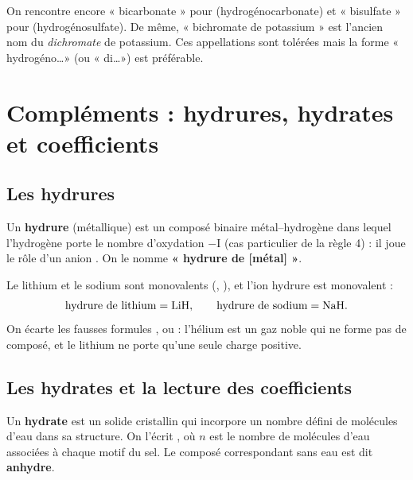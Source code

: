 \documentclass[11pt,a4paper]{article}
\begin{document}
\begin{remarque}
On rencontre encore « bicarbonate » pour  (hydrogénocarbonate) et « bisulfate » pour 
(hydrogénosulfate). De même, « bichromate de potassium »  est l'ancien nom du
\emph{dichromate} de potassium. Ces appellations sont tolérées mais la forme « hydrogéno\ldots » (ou
« di\ldots ») est préférable.
\end{remarque}

\section{Compléments : hydrures, hydrates et coefficients}
\subsection{Les hydrures}

\begin{definition}[hydrure]
Un \textbf{hydrure} (métallique) est un composé binaire métal--hydrogène dans lequel l'hydrogène porte
le nombre d'oxydation $-\mathrm{I}$ (cas particulier de la règle 4) : il joue le rôle d'un anion .
On le nomme \textbf{« hydrure de [métal] »}.
\end{definition}

\begin{exemple}
Le lithium et le sodium sont monovalents (, ), et l'ion hydrure  est monovalent :
\[ \text{hydrure de lithium} = \ce{LiH}, \qquad \text{hydrure de sodium} = \ce{NaH}. \]
On écarte les fausses formules ,  ou  : l'hélium  est un gaz noble qui ne
forme pas de composé, et le lithium ne porte qu'une seule charge positive.
\end{exemple}

\subsection{Les hydrates et la lecture des coefficients}

\begin{definition}[hydrate]
Un \textbf{hydrate} est un solide cristallin qui incorpore un nombre défini de molécules d'eau dans sa
structure. On l'écrit , où $n$ est le nombre de molécules d'eau associées à chaque motif
du sel. Le composé correspondant sans eau est dit \textbf{anhydre}.
\end{definition}
\end{document}
